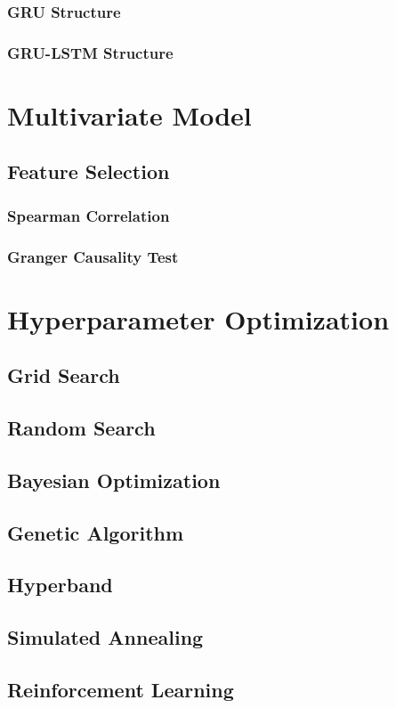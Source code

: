 \subsubsection{GRU Structure}
\subsubsection{GRU-LSTM Structure}

\section{Multivariate Model}
\subsection{Feature Selection}
\subsubsection{Spearman Correlation}
\subsubsection{Granger Causality Test}

\section{Hyperparameter Optimization}
\subsection{Grid Search}
\subsection{Random Search}
\subsection{Bayesian Optimization}
\subsection{Genetic Algorithm}
\subsection{Hyperband}
\subsection{Simulated Annealing}
\subsection{Reinforcement Learning}
